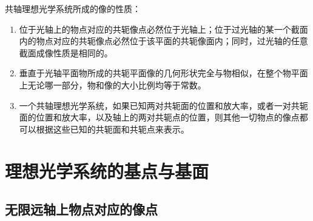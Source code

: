 \documentclass[cn,10pt,chinesefont=founder,math=newtx,cite=super,twoside]{elegantbook}
\begin{document}
\begin{property}
共轴理想光学系统所成的像的性质：
\begin{enumerate}
	\item 位于光轴上的物点对应的共轭像点必然位于光轴上；位于过光轴的某一个截面内的物点对应的共轭像点必然位于该平面的共轭像面内；同时，过光轴的任意截面成像性质是相同的。
	\item 垂直于光轴平面物所成的共轭平面像的几何形状完全与物相似，在整个物平面上无论哪一部分，物和像的大小比例均等于常数。
	\item 一个共轴理想光学系统，如果已知两对共轭面的位置和放大率，或者一对共轭面的位置和放大率，以及轴上的两对共轭点的位置，则其他一切物点的像点都可以根据这些已知的共轭面和共轭点来表示。
\end{enumerate}
\end{property}

\section{理想光学系统的基点与基面}
\subsection{无限远轴上物点对应的像点}
\label{subsect:infty-object}
\end{document}
